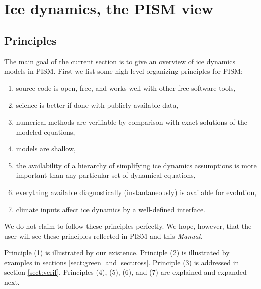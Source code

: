 \documentclass[11pt,final]{amsart}
\begin{document}
\clearpage
\newpage
\section{Ice dynamics, the PISM view}\label{sect:dynamics}

\subsection{Principles}  The main goal of the current section is to give an overview of ice dynamics models in PISM.  First we list some high-level organizing principles for PISM:
\begin{enumerate}
\item source code is open, free, and works well with other free software tools,
\item science is better if done with publicly-available data,
\item numerical methods are verifiable by comparison with exact solutions of the modeled equations,
\item models are shallow,
\item the availability of a hierarchy of simplifying ice dynamics assumptions is more important than any particular set of dynamical equations,
\item everything available diagnostically (instantaneously) is available for evolution,
\item climate inputs affect ice dynamics by a well-defined interface.
\end{enumerate}

\noindent We do not claim to follow these principles perfectly.  We hope, however, that the user will see these principles reflected in PISM and this \emph{Manual}.

Principle (1) is illustrated by our existence.  Principle (2) is illustrated by examples in sections \ref{sect:green} and \ref{sect:ross}.  Principle (3) is addressed in section \ref{sect:verif}.  Principles (4), (5), (6), and (7) are explained and expanded next.
\end{document}
